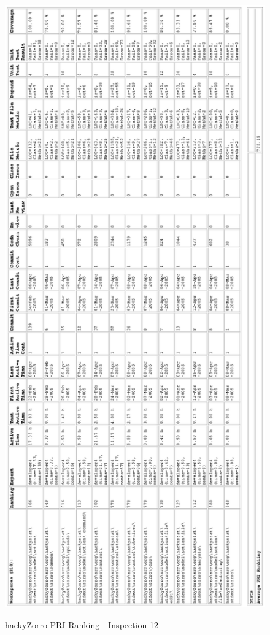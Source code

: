 \begin{figure}[!h]
  \centering
  \caption{hackyZorro PRI Ranking - Inspection 12}
  \includegraphics[totalheight=1.0\textheight]{figs/Results/12_2005-05-02-hackyZorro-printable.eps}
  \label{fig:inspection12-hackyZorro-ranking}
\end{figure}


